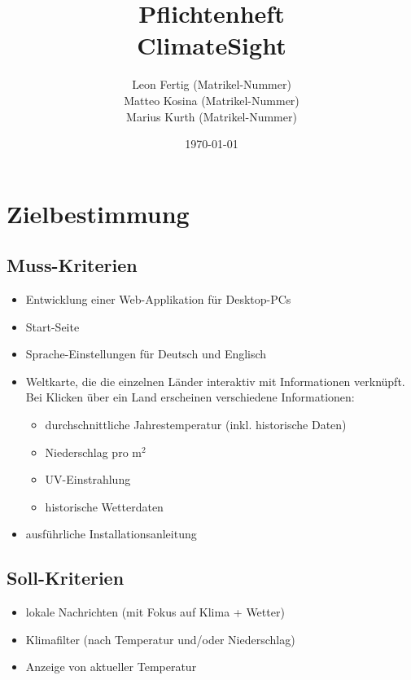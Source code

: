 \documentclass[a4paper]{scrreprt}
\begin{document}
 
\title{Pflichtenheft\\\glqq ClimateSight\grqq}
\author{Leon Fertig (Matrikel-Nummer)\\Matteo Kosina (Matrikel-Nummer) \\Marius Kurth (Matrikel-Nummer)}
\date{\today}
\maketitle


\tableofcontents
 
\chapter{Zielbestimmung}
\section{Muss-Kriterien}
\begin{itemize}
    \item Entwicklung einer Web-Applikation für Desktop-PCs
    \item Start-Seite
    \item Sprache-Einstellungen für Deutsch und Englisch
    \item Weltkarte, die die einzelnen Länder interaktiv mit Informationen verknüpft. Bei Klicken über ein Land erscheinen verschiedene Informationen:
    \begin{itemize}
        \item durchschnittliche Jahrestemperatur (inkl. historische Daten)
        \item Niederschlag pro m$^2$
        \item UV-Einstrahlung
        \item historische Wetterdaten
    \end{itemize}
    \item ausführliche Installationsanleitung
\end{itemize}

\section{Soll-Kriterien}
\begin{itemize}
    \item lokale Nachrichten (mit Fokus auf Klima + Wetter)
    \item Klimafilter (nach Temperatur und/oder Niederschlag)
    \item Anzeige von aktueller Temperatur
\end{itemize}
\end{document}
